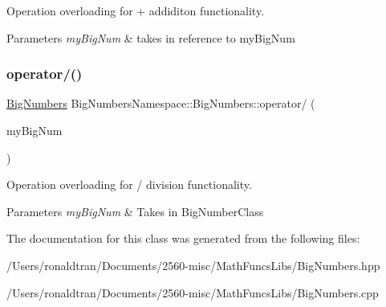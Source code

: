 Operation overloading for + addiditon functionality. 


\begin{DoxyParams}{Parameters}
{\em my\+Big\+Num} & takes in reference to my\+Big\+Num \\
\hline
\end{DoxyParams}
\mbox{\label{class_big_numbers_namespace_1_1_big_numbers_ac2798a7517787c6b9609256e685ddc01}} 
\subsubsection{\texorpdfstring{operator/()}{operator/()}}
{\footnotesize\ttfamily \mbox{\hyperlink{class_big_numbers_namespace_1_1_big_numbers}{Big\+Numbers}} Big\+Numbers\+Namespace\+::\+Big\+Numbers\+::operator/ (\begin{DoxyParamCaption}\item[{const \mbox{\hyperlink{class_big_numbers_namespace_1_1_big_numbers}{Big\+Numbers}} \&}]{my\+Big\+Num }\end{DoxyParamCaption})\hspace{0.3cm}{\ttfamily [private]}}



Operation overloading for / division functionality. 


\begin{DoxyParams}{Parameters}
{\em my\+Big\+Num} & Takes in Big\+Number\+Class \\
\hline
\end{DoxyParams}


The documentation for this class was generated from the following files\+:\begin{DoxyCompactItemize}
\item 
/\+Users/ronaldtran/\+Documents/2560-\/misc/\+Math\+Funcs\+Libs/Big\+Numbers.\+hpp\item 
/\+Users/ronaldtran/\+Documents/2560-\/misc/\+Math\+Funcs\+Libs/Big\+Numbers.\+cpp\end{DoxyCompactItemize}
